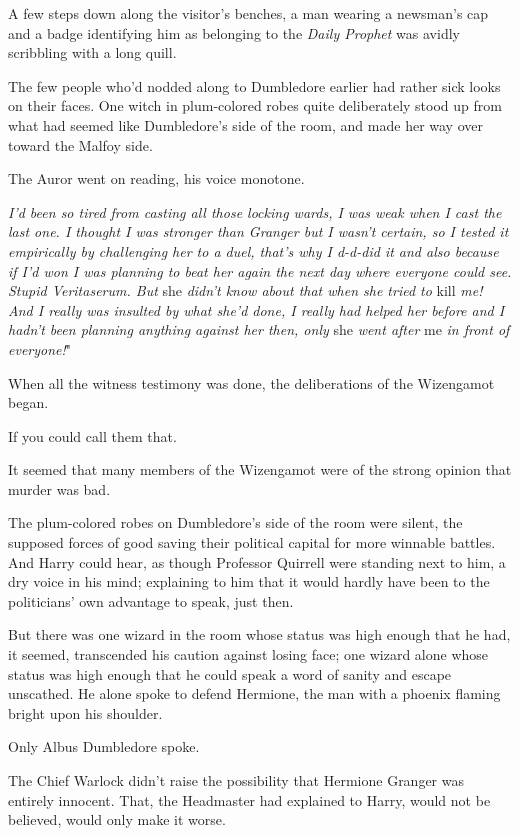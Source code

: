 A few steps down along the visitor's benches, a man wearing a newsman's cap and 
a badge identifying him as belonging to the \emph{Daily Prophet} was avidly 
scribbling with a long quill.

The few people who'd nodded along to Dumbledore earlier had rather sick looks 
on their faces. One witch in plum-colored robes quite deliberately stood up 
from what had seemed like Dumbledore's side of the room, and made her way over 
toward the Malfoy side.

The Auror went on reading, his voice monotone.

\emph{I'd been so tired from casting all those locking wards, I was weak when I 
cast the last one. I thought I was stronger than Granger but I wasn't certain, 
so I tested it empirically by challenging her to a duel, that's why I d-d-did 
it and also because if I'd won I was planning to beat her again the next day 
where everyone could see. Stupid Veritaserum. But} she\emph{ didn't know about 
that when she tried to} kill\emph{ me! And I really was insulted by what she'd 
done, I really had helped her before and I hadn't been planning anything 
against her then, only} she\emph{ went after} me\emph{ in front of everyone!}"

When all the witness testimony was done, the deliberations of the Wizengamot 
began.

If you could call them that.

It seemed that many members of the Wizengamot were of the strong opinion that 
murder was bad.

The plum-colored robes on Dumbledore's side of the room were silent, the 
supposed forces of good saving their political capital for more winnable 
battles. And Harry could hear, as though Professor Quirrell were standing next 
to him, a dry voice in his mind; explaining to him that it would hardly have 
been to the politicians' own advantage to speak, just then.

But there was one wizard in the room whose status was high enough that he had, 
it seemed, transcended his caution against losing face; one wizard alone whose 
status was high enough that he could speak a word of sanity and escape 
unscathed. He alone spoke to defend Hermione, the man with a phoenix flaming 
bright upon his shoulder.

Only Albus Dumbledore spoke.

The Chief Warlock didn't raise the possibility that Hermione Granger was 
entirely innocent. That, the Headmaster had explained to Harry, would not be 
believed, would only make it worse.

